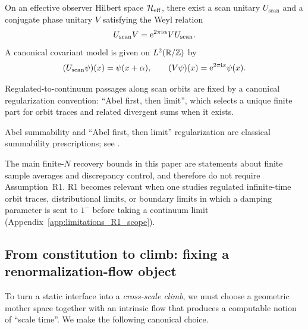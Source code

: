 \begin{axiom}
On an effective observer Hilbert space $\mathcal{H}_{\mathrm{eff}}$, there exist a scan unitary $U_{\mathrm{scan}}$ and a conjugate phase unitary $V$ satisfying the Weyl relation
\begin{equation}
U_{\mathrm{scan}} V = \mathrm{e}^{2\pi \mathrm{i} \alpha} V U_{\mathrm{scan}}.
\end{equation}
A canonical covariant model is given on $L^2(\mathbb{R}/\mathbb{Z})$ by
\begin{equation}
(U_{\mathrm{scan}}\psi)(x)=\psi(x+\alpha),\qquad (V\psi)(x)=\mathrm{e}^{2\pi \mathrm{i} x}\psi(x).
\end{equation}
\end{axiom}

\begin{assumption}
Regulated-to-continuum passages along scan orbits are fixed by a canonical regularization convention: ``Abel first, then limit'', which selects a unique finite part for orbit traces and related divergent sums when it exists.
\end{assumption}
\begin{remark}
Abel summability and ``Abel first, then limit'' regularization are classical summability prescriptions; see \cite{Hardy1949}.
\end{remark}
\begin{remark}[scope of R1]
The main finite-$N$ recovery bounds in this paper are statements about finite sample averages and discrepancy control, and therefore do not require Assumption~R1.
R1 becomes relevant when one studies regulated infinite-time orbit traces, distributional limits, or boundary limits in which a damping parameter is sent to $1^-$ before taking a continuum limit (Appendix~\ref{app:limitations_R1_scope}).
\end{remark}

\subsection{From constitution to climb: fixing a renormalization-flow object}
\label{sec:renormalization_flow_object}

To turn a static interface into a \emph{cross-scale climb}, we must choose a geometric mother space together with an intrinsic flow that produces a computable notion of ``scale time''. We make the following canonical choice.

